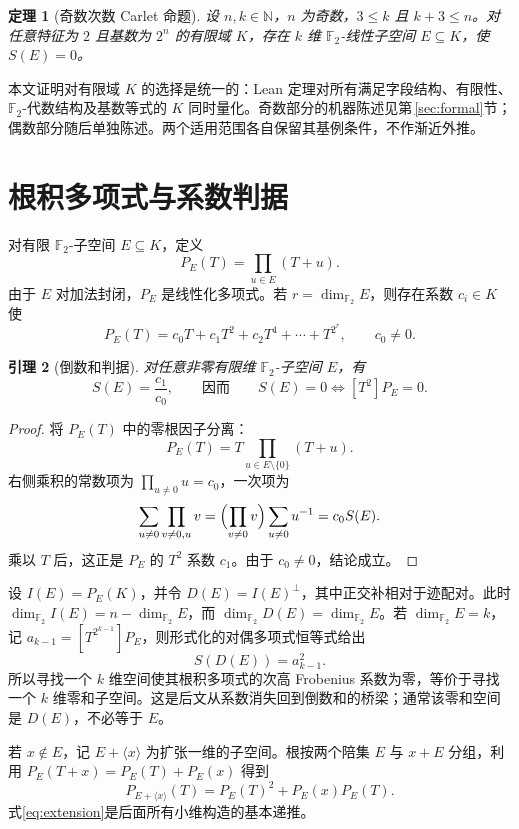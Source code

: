 \documentclass[UTF8,a4paper,11pt]{ctexart}
\numberwithin{equation}{section}
\newtheorem{theorem}{定理}[section]
\newtheorem{lemma}[theorem]{引理}
\theoremstyle{definition}
\theoremstyle{remark}
\newcommand{\Ftwo}{\mathbb F_2}
\newcommand{\dimf}{\dim_{\Ftwo}}
\begin{document}
\begin{theorem}[奇数次数 Carlet 命题]\label{thm:main}
设 $n,k\in\mathbb N$，$n$ 为奇数，$3\le k$ 且 $k+3\le n$。对任意特征为 $2$ 且基数为 $2^n$ 的有限域 $K$，存在 $k$ 维 $\Ftwo$-线性子空间 $E\subseteq K$，使 $S(E)=0$。
\end{theorem}

本文证明对有限域 $K$ 的选择是统一的：Lean 定理对所有满足字段结构、有限性、$\Ftwo$-代数结构及基数等式的 $K$ 同时量化。奇数部分的机器陈述见第\,\ref{sec:formal}节；偶数部分随后单独陈述。两个适用范围各自保留其基例条件，不作渐近外推。

\section{根积多项式与系数判据}

对有限 $\Ftwo$-子空间 $E\subseteq K$，定义
\[
  P_E(T)=\prod_{u\in E}(T+u).
\]
由于 $E$ 对加法封闭，$P_E$ 是线性化多项式。若 $r=\dimf E$，则存在系数 $c_i\in K$ 使
\[
  P_E(T)=c_0T+c_1T^2+c_2T^4+\cdots+T^{2^r},\qquad c_0\ne0.
\]

\begin{lemma}[倒数和判据]\label{lem:coeff}
对任意非零有限维 $\Ftwo$-子空间 $E$，有
\[
  S(E)=\frac{c_1}{c_0},\qquad\text{因而}\qquad S(E)=0\Longleftrightarrow [T^2]P_E=0.
\]
\end{lemma}
\begin{proof}
将 $P_E(T)$ 中的零根因子分离：
\[
 P_E(T)=T\prod_{u\in E\setminus\{0\}}(T+u).
\]
右侧乘积的常数项为 $\prod_{u\ne0}u=c_0$，一次项为
\[
 \sum_{u\ne0}\prod_{v\ne0,u}v
 =\Bigl(\prod_{v\ne0}v\Bigr)\sum_{u\ne0}u^{-1}=c_0S(E).
\]
乘以 $T$ 后，这正是 $P_E$ 的 $T^2$ 系数 $c_1$。由于 $c_0\ne0$，结论成立。
\end{proof}

设 $I(E)=P_E(K)$，并令 $D(E)=I(E)^\perp$，其中正交补相对于迹配对。此时 $\dimf I(E)=n-\dimf E$，而 $\dimf D(E)=\dimf E$。若 $\dimf E=k$，记 $a_{k-1}=[T^{2^{k-1}}]P_E$，则形式化的对偶多项式恒等式给出
\begin{equation}\label{eq:duality}
 S(D(E))=a_{k-1}^{2}.
\end{equation}
所以寻找一个 $k$ 维空间使其根积多项式的次高 Frobenius 系数为零，等价于寻找一个 $k$ 维零和子空间。这是后文从系数消失回到倒数和的桥梁；通常该零和空间是 $D(E)$，不必等于 $E$。

若 $x\notin E$，记 $E+\langle x\rangle$ 为扩张一维的子空间。根按两个陪集 $E$ 与 $x+E$ 分组，利用 $P_E(T+x)=P_E(T)+P_E(x)$ 得到
\begin{equation}\label{eq:extension}
 P_{E+\langle x\rangle}(T)=P_E(T)^2+P_E(x)P_E(T).
\end{equation}
式\eqref{eq:extension}是后面所有小维构造的基本递推。
\end{document}
